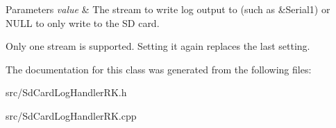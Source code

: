 \begin{DoxyParams}{Parameters}
{\em value} & The stream to write log output to (such as \&Serial1) or N\+U\+LL to only write to the SD card.\\
\hline
\end{DoxyParams}
Only one stream is supported. Setting it again replaces the last setting. 

The documentation for this class was generated from the following files\+:\begin{DoxyCompactItemize}
\item 
src/Sd\+Card\+Log\+Handler\+R\+K.\+h\item 
src/Sd\+Card\+Log\+Handler\+R\+K.\+cpp\end{DoxyCompactItemize}
